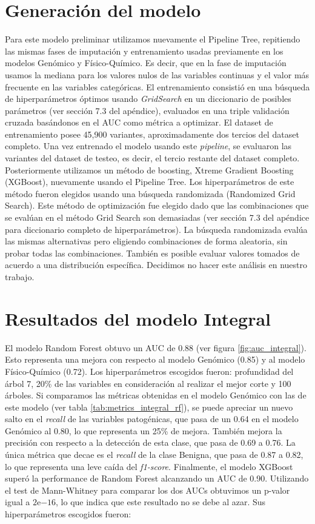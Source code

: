 \section{Generación del modelo}

Para este modelo preliminar utilizamos nuevamente el Pipeline Tree, repitiendo las mismas fases de imputación y entrenamiento usadas previamente en los modelos Genómico y Físico-Químico. Es decir, que en la fase de imputación usamos la mediana para los valores nulos de las variables continuas y el valor más frecuente en las variables categóricas. El entrenamiento consistió en una búsqueda de hiperparámetros óptimos usando \textit{GridSearch} en un diccionario de posibles parámetros (ver sección 7.3 del apéndice), evaluados en una triple validación cruzada basándonos en el AUC como métrica a optimizar. El dataset de entrenamiento posee 45,900 variantes, aproximadamente dos tercios del dataset completo. Una vez entrenado el modelo usando este \textit{pipeline}, se evaluaron las variantes del dataset de testeo, es decir, el tercio restante del dataset completo. Posteriormente utilizamos un método de boosting, Xtreme Gradient Boosting (XGBoost), nuevamente usando el Pipeline Tree. Los hiperparámetros de este método fueron elegidos usando una búsqueda randomizada (Randomized Grid Search). Este método de optimización fue elegido dado que las combinaciones que se evalúan en el método Grid Search son demasiadas (ver sección 7.3 del apéndice para diccionario completo de hiperparámetros). La búsqueda randomizada evalúa las mismas alternativas pero eligiendo combinaciones de forma aleatoria, sin probar todas las combinaciones. También es posible evaluar valores tomados de acuerdo a una distribución específica. Decidimos no hacer este análisis en nuestro trabajo.

\section{Resultados del modelo Integral}

El modelo Random Forest obtuvo un AUC de 0.88  (ver figura \ref{fig:auc_integral}). Esto representa una mejora con respecto al modelo Genómico (0.85) y al modelo Físico-Químico (0.72). Los hiperparámetros escogidos fueron: profundidad del árbol 7, 20\% de las variables en consideración al realizar el mejor corte y 100 árboles.
Si comparamos las métricas obtenidas en el modelo Genómico con las de este modelo (ver tabla \ref{tab:metrics_integral_rf}), se puede apreciar un nuevo salto en el \textit{recall} de las variables patogénicas, que pasa de un 0.64 en el modelo Genómico al 0.80, lo que representa un 25\% de mejora. También mejora la precisión con respecto a la detección de esta clase, que pasa de 0.69 a 0.76. La única métrica que decae es el \textit{recall} de la clase Benigna, que pasa de 0.87 a 0.82, lo que representa una leve caída del \textit{f1-score}. 
Finalmente, el modelo XGBoost superó la performance de Random Forest alcanzando un AUC de 0.90. Utilizando el test de Mann-Whitney para comparar los dos AUCs obtuvimos un p-valor igual a $2\mathrm{e}{-16}$, lo que indica que este resultado no se debe al azar. Sus hiperparámetros escogidos fueron:

